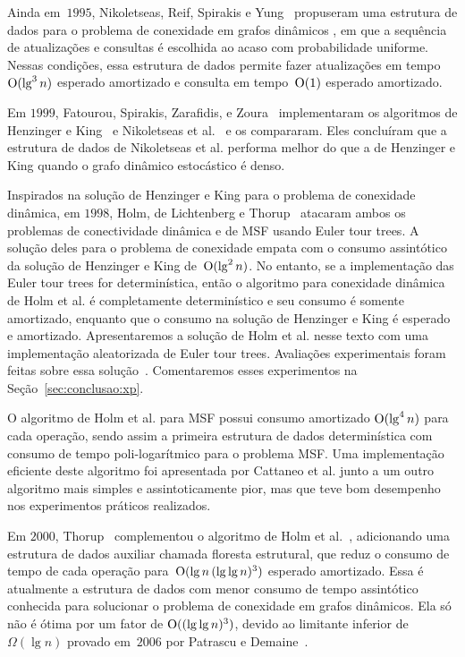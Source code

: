 Ainda em~$1995$, Nikoletseas, Reif, Spirakis e Yung~\cite{NikoletseasRSY} propuseram uma estrutura de dados para o problema de conexidade em grafos dinâmicos , em que a sequência de atualizações e consultas é escolhida ao acaso com probabilidade uniforme.
Nessas condições, essa estrutura de dados permite fazer atualizações em tempo~$\mathrm{O}(\lg^3 n)$ esperado amortizado e consulta em tempo~$\mathrm{O}(1)$ esperado amortizado.

Em $1999$, Fatourou, Spirakis, Zarafidis, e Zoura~\cite{Fatourou} implementaram os algoritmos de Henzinger e King~\cite{HenzingerKing} e Nikoletseas et al.~\cite{NikoletseasRSY} e os compararam. Eles concluíram que a estrutura de dados de Nikoletseas et al. performa melhor do que a de Henzinger e King quando o grafo dinâmico estocástico é denso.

Inspirados na solução de Henzinger e King para o problema de conexidade dinâmica, em $1998$, Holm, de Lichtenberg e Thorup~\cite{poly_log} atacaram ambos os problemas de conectividade dinâmica e de MSF usando Euler tour trees.
A solução deles para o problema de conexidade empata com o consumo assintótico da solução de Henzinger e King de~$\mathrm{O}(\lg^2 n)$.
No entanto, se a implementação das Euler tour trees for determinística, então o algoritmo para conexidade dinâmica de Holm et al. é completamente determinístico e seu consumo é somente amortizado,
enquanto que o consumo na solução de Henzinger e King é esperado e amortizado. 
Apresentaremos a solução de Holm et al. nesse texto com uma implementação aleatorizada de Euler tour trees.
Avaliações experimentais foram feitas sobre essa solução~\cite{EmpiricalStudy1997, EmpiricalStudy2002,xp-Phylogeny}.
Comentaremos esses experimentos na Seção~\ref{sec:conclusao:xp}.

O algoritmo de Holm et al. para MSF possui consumo amortizado $\mathrm{O}(\lg^4 n)$ para cada operação, sendo assim a primeira estrutura de dados determinística com consumo de tempo poli-logarítmico para o problema MSF. Uma implementação eficiente deste algoritmo foi apresentada por Cattaneo et al. \cite{xpstudy2002} junto a um outro algoritmo mais simples e assintoticamente pior, mas que teve bom desempenho nos experimentos práticos realizados.

Em $2000$, Thorup~\cite{Thorup2000} complementou o algoritmo de Holm et al.~\cite{poly_log}, adicionando uma estrutura de dados auxiliar chamada floresta estrutural, que reduz o consumo de tempo de cada operação para~$\mathrm{O}(\lg n\, (\lg\lg n)^3)$ esperado amortizado.
Essa é atualmente a estrutura de dados com menor consumo de tempo assintótico conhecida para solucionar o problema de conexidade em grafos dinâmicos.
Ela só não é ótima por um fator de $\mathrm{O}((\lg\lg n)^3)$, devido ao limitante inferior de~$\Omega(\lg n)$ provado em~$2006$ por Patrascu e Demaine~\cite{lowerBoundPatrascu}.

